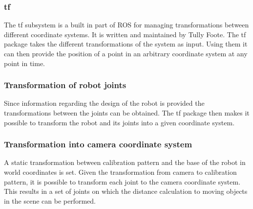 \subsubsection{tf}
The tf subsystem is a built in part of ROS for managing transformations between different coordinate systems. It is written and maintained by Tully Foote. The tf package takes the different transformations of the system as input. Using them it can then provide the position of a point in an arbitrary coordinate system at any point in time.

\subsubsection{Transformation of robot joints}
Since information regarding the design of the robot is provided the transformations between the joints can be obtained. The tf package then makes it possible to transform the robot and its joints into a given coordinate system.

\subsubsection{Transformation into camera coordinate system}
A static transformation between calibration pattern and the base of the robot in world coordinates is set. Given the transformation from camera to calibration pattern, it is possible to transform each joint to the camera coordinate system. This results in a set of joints on which the distance calculation to moving objects in the scene can be performed. 
